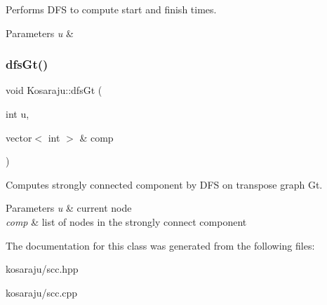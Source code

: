 Performs D\+FS to compute start and finish times. 


\begin{DoxyParams}{Parameters}
{\em u} & \\
\hline
\end{DoxyParams}
\mbox{\label{classKosaraju_a7168221343761e5db6cac1dfe04882bb}} 
\subsubsection{\texorpdfstring{dfs\+Gt()}{dfsGt()}}
{\footnotesize\ttfamily void Kosaraju\+::dfs\+Gt (\begin{DoxyParamCaption}\item[{int}]{u,  }\item[{vector$<$ int $>$ \&}]{comp }\end{DoxyParamCaption})\hspace{0.3cm}{\ttfamily [private]}}



Computes strongly connected component by D\+FS on transpose graph Gt. 


\begin{DoxyParams}{Parameters}
{\em u} & current node \\
\hline
{\em comp} & list of nodes in the strongly connect component \\
\hline
\end{DoxyParams}


The documentation for this class was generated from the following files\+:\begin{DoxyCompactItemize}
\item 
kosaraju/scc.\+hpp\item 
kosaraju/scc.\+cpp\end{DoxyCompactItemize}
